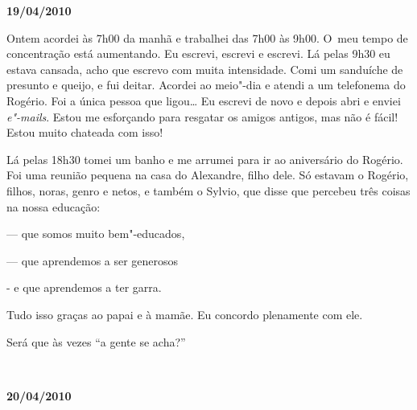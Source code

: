 \begin{flushright}\textbf{19/04/2010}\end{flushright}


Ontem acordei às 7h00 da manhã e trabalhei das 7h00 às 9h00. O~meu tempo
de concentração está aumentando. Eu escrevi, escrevi e escrevi. Lá pelas
9h30 eu estava cansada, acho que escrevo com muita intensidade. Comi um
sanduíche de presunto e queijo, e fui deitar. Acordei ao meio"-dia e
atendi a um telefonema do Rogério. Foi a única pessoa que ligou…
Eu escrevi de novo e depois abri e enviei \emph{e"-mails}. Estou me
esforçando para resgatar os amigos antigos, mas não é fácil! Estou muito
chateada com isso!

Lá pelas 18h30 tomei um banho e me arrumei para ir ao aniversário do
Rogério. Foi uma reunião pequena na casa do Alexandre, filho dele. Só
estavam o Rogério, filhos, noras, genro e netos, e também o Sylvio, que
disse que percebeu três coisas na nossa educação:

--- que somos muito bem"-educados,

--- que aprendemos a ser generosos

- e que aprendemos a ter garra.

Tudo isso graças ao papai e à mamãe. Eu concordo plenamente com ele.

Será que às vezes ``a gente se acha?''

\begin{center}\asterisc{}​\end{center}

\begin{flushright}\textbf{}\end{flushright}

\begin{flushright}\textbf{20/04/2010}\end{flushright}


